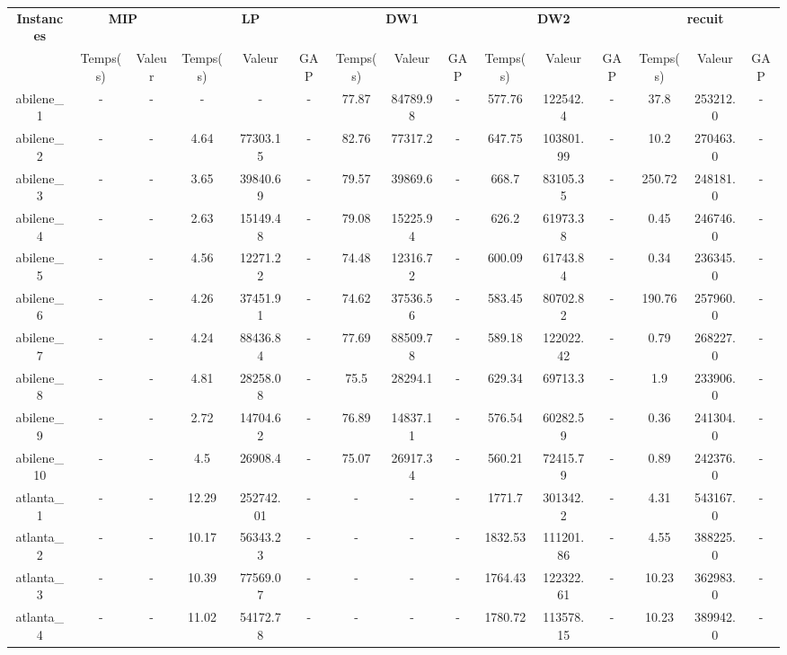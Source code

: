 \documentclass[main.tex]{subfiles}
\begin{document}
\thispagestyle{empty}

\begin{landscape}
\begin{table}[h]
    \centering
    \begin{tabular}{c|cc|ccc|ccc|ccc|ccc}
	\hline	
	\textbf{Instances} &\multicolumn{2}{c}{\textbf{MIP}} &\multicolumn{3}{c}{\textbf{LP}} &\multicolumn{3}{c}{\textbf{DW1}} &\multicolumn{3}{c}{\textbf{DW2}} &\multicolumn{3}{c}{\textbf{recuit}}\\
	 &Temps(s) &Valeur &Temps(s) &Valeur &GAP &Temps(s) &Valeur &GAP &Temps(s) &Valeur &GAP &Temps(s) &Valeur &GAP\\

	\hline
	abilene\_1 &- &- &- &- &- &77.87 &84789.98 &- &577.76 &122542.4 &- &37.8 &253212.0 &-\\
	abilene\_2 &- &- &4.64 &77303.15 &- &82.76 &77317.2 &- &647.75 &103801.99 &- &10.2 &270463.0 &-\\
	abilene\_3 &- &- &3.65 &39840.69 &- &79.57 &39869.6 &- &668.7 &83105.35 &- &250.72 &248181.0 &-\\
	abilene\_4 &- &- &2.63 &15149.48 &- &79.08 &15225.94 &- &626.2 &61973.38 &- &0.45 &246746.0 &-\\
	abilene\_5 &- &- &4.56 &12271.22 &- &74.48 &12316.72 &- &600.09 &61743.84 &- &0.34 &236345.0 &-\\
	abilene\_6 &- &- &4.26 &37451.91 &- &74.62 &37536.56 &- &583.45 &80702.82 &- &190.76 &257960.0 &-\\
	abilene\_7 &- &- &4.24 &88436.84 &- &77.69 &88509.78 &- &589.18 &122022.42 &- &0.79 &268227.0 &-\\
	abilene\_8 &- &- &4.81 &28258.08 &- &75.5 &28294.1 &- &629.34 &69713.3 &- &1.9 &233906.0 &-\\
	abilene\_9 &- &- &2.72 &14704.62 &- &76.89 &14837.11 &- &576.54 &60282.59 &- &0.36 &241304.0 &-\\
	abilene\_10 &- &- &4.5 &26908.4 &- &75.07 &26917.34 &- &560.21 &72415.79 &- &0.89 &242376.0 &-\\
	atlanta\_1 &- &- &12.29 &252742.01 &- &- &- &- &1771.7 &301342.2 &- &4.31 &543167.0 &-\\
	atlanta\_2 &- &- &10.17 &56343.23 &- &- &- &- &1832.53 &111201.86 &- &4.55 &388225.0 &-\\
	atlanta\_3 &- &- &10.39 &77569.07 &- &- &- &- &1764.43 &122322.61 &- &10.23 &362983.0 &-\\
	atlanta\_4 &- &- &11.02 &54172.78 &- &- &- &- &1780.72 &113578.15 &- &10.23 &389942.0 &-\\

\end{tabular}
\end{table}
\end{landscape}
\end{document}
